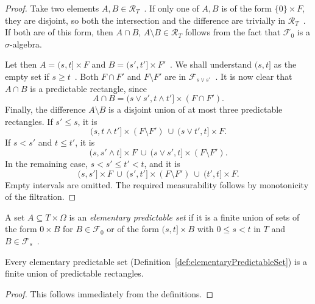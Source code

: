 \begin{proof} \leanok
  Take two elements $A, B \in \mathcal{R}_T$~.
  If only one of $A, B$ is of the form $\{0\} \times F$,
  they are disjoint, so both the intersection and the difference
  are trivially in $\mathcal{R}_T$~.
  If both are of this form, then $A\cap B$, $A\setminus B\in\mathcal{R}_T$
  follows from the fact that $\mathcal{F}_0$ is a $\sigma$-algebra.

  Let then $A=(s, t] \times F$ and $B=(s', t'] \times F'$~.
  We shall understand $(s,t]$ as the empty set if $s \ge t$~.
  Both $F \cap F'$ and $F \setminus F'$ are in $\mathcal{F}_{s \vee s'}$~.
  It is now clear that $A\cap B$ is a predictable rectangle, since
  \[
  A \cap B
  =
  (s \vee s', t \wedge t'] \times (F \cap F').
  \]
  Finally, the difference $A \setminus B$ is a disjoint union of at most three
  predictable rectangles. If $s'\le s$, it is
  \[
    (s,t\wedge t']\times(F\setminus F')
    \ \cup\ (s\vee t',t]\times F.
  \]
  If $s<s'$ and $t\le t'$, it is
  \[
    (s,s'\wedge t]\times F
    \ \cup\ (s\vee s',t]\times(F\setminus F').
  \]
  In the remaining case, $s<s'\le t'<t$, and it is
  \[
    (s,s']\times F
    \ \cup\ (s',t']\times(F\setminus F')
    \ \cup\ (t',t]\times F.
  \]
  Empty intervals are omitted. The required measurability follows by
  monotonicity of the filtration.
\end{proof}

\begin{definition}\label{def:elementaryPredictableSet}
  \leanok
A set $A \subseteq T \times \Omega$ is an \emph{elementary predictable set} if it is a finite union of sets of the form ${0} \times B$ for $B \in \mathcal{F}_0$ or of the form $(s, t] \times B$ with $0 \le s < t$ in $T$ and $B \in \mathcal{F}_s$~.
\end{definition}


\begin{lemma}\label{lem:predictableRectangles_generate_elementaryPredictableSets}
  Every elementary predictable set (Definition~\ref{def:elementaryPredictableSet})
  is a finite union of predictable rectangles.
\end{lemma}

\begin{proof}
  This follows immediately from the definitions.
\end{proof}

